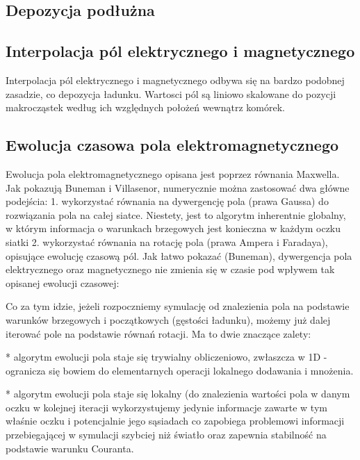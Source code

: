     \subsection{Depozycja podłużna}

    \subsection{Interpolacja pól elektrycznego i magnetycznego}

    Interpolacja pól elektrycznego i magnetycznego odbywa się na bardzo podobnej
    zasadzie, co depozycja ładunku. Wartosci pól są liniowo skalowane do pozycji
    makrocząstek według ich względnych położeń wewnątrz komórek.

    \subsection{Ewolucja czasowa pola elektromagnetycznego} 

    Ewolucja pola elektromagnetycznego opisana jest poprzez równania Maxwella.
    Jak pokazują Buneman i Villasenor, numerycznie można zastosować dwa główne
    podejścia:  1. wykorzystać równania na dywergencję
    pola (prawa Gaussa) do rozwiązania pola na całej siatce. Niestety, jest to
    algorytm inherentnie globalny, w którym informacja o warunkach brzegowych
    jest konieczna w każdym oczku siatki
    2. wykorzystać równania na rotację pola (prawa Ampera i Faradaya), opisujące ewolucję czasową pól. Jak łatwo pokazać (Buneman),
    dywergencja pola elektrycznego oraz magnetycznego nie zmienia się w czasie pod wpływem tak opisanej ewolucji czasowej:

    Co za tym idzie, jeżeli rozpoczniemy symulację od znalezienia pola na
    podstawie warunków brzegowych i początkowych (gęstości ładunku), możemy już
    dalej iterować pole na podstawie równań rotacji. Ma to dwie znaczące
    zalety:

    * algorytm ewolucji pola staje się trywialny obliczeniowo,
    zwłaszcza w 1D - ogranicza się bowiem do elementarnych operacji lokalnego
    dodawania i mnożenia.

    * algorytm ewolucji pola staje się lokalny (do
    znalezienia wartości pola w danym oczku w kolejnej iteracji wykorzystujemy
    jedynie informacje zawarte w tym właśnie oczku i potencjalnie jego
    sąsiadach  co zapobiega
    problemowi informacji przebiegającej w symulacji szybciej niż światło oraz
    zapewnia stabilność na podstawie
    warunku Couranta.

